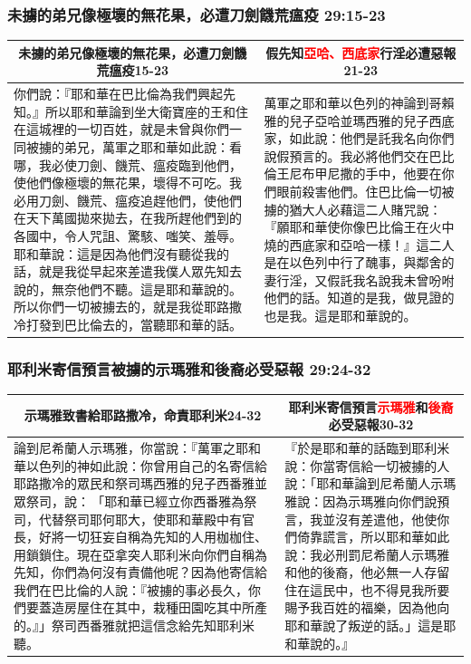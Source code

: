 \subsubsection{未擄的弟兄像極壞的無花果，必遭刀劍饑荒瘟疫 29:15-23}
\begin{table}[H]
\centering
\begin{tabular}{p{9.75cm}|p{7.50cm}}\hline\hline
\multicolumn{1}{c|}{未擄的弟兄像極壞的無花果，必遭刀劍饑荒瘟疫15-23}&\multicolumn{1}{c}{假先知\textcolor{red}{亞哈、西底家}行淫必遭惡報21-23}\\\hline
你們說：『耶和華在巴比倫為我們興起先知。』所以耶和華論到坐大衛寶座的王和住在這城裡的一切百姓，就是未曾與你們一同被擄的弟兄，萬軍之耶和華如此說：看哪，我必使刀劍、饑荒、瘟疫臨到他們，使他們像極壞的無花果，壞得不可吃。我必用刀劍、饑荒、瘟疫追趕他們，使他們在天下萬國拋來拋去，在我所趕他們到的各國中，令人咒詛、驚駭、嗤笑、羞辱。耶和華說：這是因為他們沒有聽從我的話，就是我從早起來差遣我僕人眾先知去說的，無奈他們不聽。這是耶和華說的。所以你們一切被擄去的，就是我從耶路撒冷打發到巴比倫去的，當聽耶和華的話。
&萬軍之耶和華以色列的神論到哥賴雅的兒子亞哈並瑪西雅的兒子西底家，如此說：他們是託我名向你們說假預言的。我必將他們交在巴比倫王尼布甲尼撒的手中，他要在你們眼前殺害他們。住巴比倫一切被擄的猶大人必藉這二人賭咒說：『願耶和華使你像巴比倫王在火中燒的西底家和亞哈一樣！』這二人是在以色列中行了醜事，與鄰舍的妻行淫，又假託我名說我未曾吩咐他們的話。知道的是我，做見證的也是我。這是耶和華說的。\\\hline
\end{tabular}
\end{table}


\subsubsection{耶利米寄信預言被擄的示瑪雅和後裔必受惡報 29:24-32}
\begin{table}[H]
\centering
\begin{tabular}{p{}|p{7.0cm}}\hline\hline
\multicolumn{1}{c|}{示瑪雅致書給耶路撒冷，命責耶利米24-32}&\multicolumn{1}{c}{耶利米寄信預言\textcolor{red}{示瑪雅}和\textcolor{red}{後裔}必受惡報30-32}\\\hline
論到尼希蘭人示瑪雅，你當說：『萬軍之耶和華以色列的神如此說：你曾用自己的名寄信給耶路撒冷的眾民和祭司瑪西雅的兒子西番雅並眾祭司，說： 「耶和華已經立你西番雅為祭司，代替祭司耶何耶大，使耶和華殿中有官長，好將一切狂妄自稱為先知的人用枷枷住、用鎖鎖住。現在亞拿突人耶利米向你們自稱為先知，你們為何沒有責備他呢？因為他寄信給我們在巴比倫的人說：『被擄的事必長久，你們要蓋造房屋住在其中，栽種田園吃其中所產的。』」祭司西番雅就把這信念給先知耶利米聽。
&『於是耶和華的話臨到耶利米說：你當寄信給一切被擄的人說：「耶和華論到尼希蘭人示瑪雅說：因為示瑪雅向你們說預言，我並沒有差遣他，他使你們倚靠謊言，所以耶和華如此說：我必刑罰尼希蘭人示瑪雅和他的後裔，他必無一人存留住在這民中，也不得見我所要賜予我百姓的福樂，因為他向耶和華說了叛逆的話。」這是耶和華說的。』\\\hline
\end{tabular}
\end{table}



